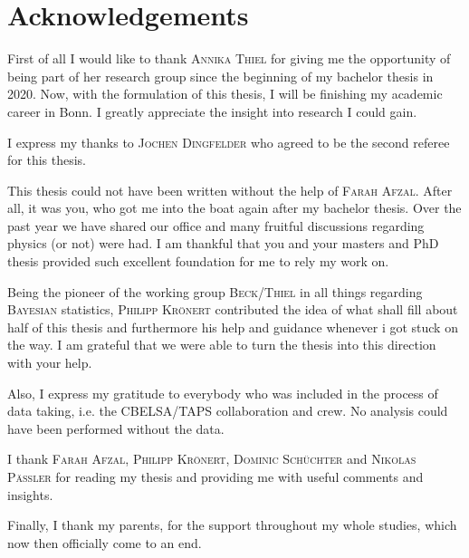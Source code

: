 \chapter*{Acknowledgements}
\label{sec:ack}

\noindent First of all I would like to thank \textsc{Annika Thiel} for giving me the opportunity of being part of her research group since the beginning of my bachelor thesis in 2020. Now, with the formulation of this thesis, I will be finishing my academic career in Bonn. I greatly appreciate the insight into research I could gain.
\vspace{1cm}

\noindent I express my thanks to \textsc{Jochen Dingfelder} who agreed to be the second referee for this thesis.
\vspace{1cm}

\noindent This thesis could not have been written without the help of \textsc{Farah Afzal}. After all, it was you, who got me into the boat again after my bachelor thesis. Over the past year we have shared our office and many fruitful discussions regarding physics (or not) were had. I am thankful that you and your masters and PhD thesis provided such excellent foundation for me to rely my work on.
\vspace{1cm}

\noindent Being the pioneer of the working group \textsc{Beck/Thiel} in all things regarding \textsc{Bayesian} statistics, \textsc{Philipp Krönert} contributed the idea of what shall fill about half of this thesis and furthermore his help and guidance whenever i got stuck on the way. I am grateful that we were able to turn the thesis into this direction with your help.
\vspace{1cm}

\noindent Also, I express my gratitude to everybody who was included in the process of data taking, i.e. the CBELSA/TAPS collaboration and crew. No analysis could have been performed without the data.
\vspace{1cm}

\noindent I thank \textsc{Farah Afzal, Philipp Krönert, Dominic Schüchter} and \textsc{Nikolas Pässler} for reading my thesis and providing me with useful comments and insights.
\vspace{1cm}

\noindent Finally, I thank my parents, for the support throughout my whole studies, which now then officially come to an end. 

   


